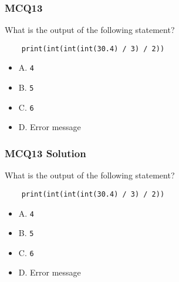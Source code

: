 \documentclass{beamer}
\begin{document}
\begin{frame}[fragile]
    \frametitle{MCQ13}
    What is the output of the following statement?
    \begin{verbatim}
    print(int(int(int(30.4) / 3) / 2))
    \end{verbatim}
    \begin{itemize}
        \item A. \texttt{4}
        \item B. \texttt{5}
        \item C. \texttt{6}
        \item D. Error message
    \end{itemize}
\end{frame}
\begin{frame}[fragile]
    \frametitle{MCQ13 Solution}
    What is the output of the following statement?
    \begin{verbatim}
    print(int(int(int(30.4) / 3) / 2))
    \end{verbatim}
    \begin{itemize}
        \item A. \texttt{4}
        \item \alert{B. \texttt{5}}
        \item C. \texttt{6}
        \item D. Error message
    \end{itemize}
\end{frame}
\end{document}

